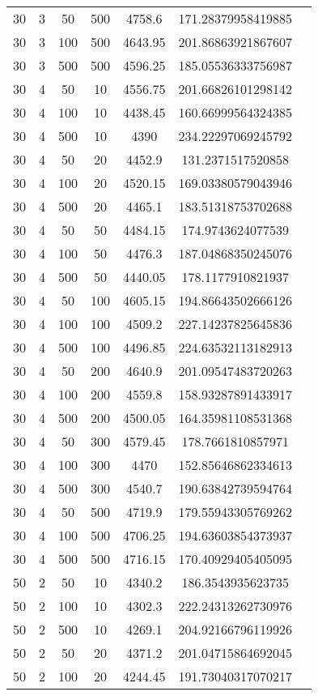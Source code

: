 {\begin{longtabu}{S
S
S
S
S
S[round-mode=places,round-precision=0]
S[round-mode=places,round-precision=0]}
30 & 3 & 50 & 500 & 4758.6 & 171.28379958419885 \\
30 & 3 & 100 & 500 & 4643.95 & 201.86863921867607 \\
30 & 3 & 500 & 500 & 4596.25 & 185.05536333756987 \\
30 & 4 & 50 & 10 & 4556.75 & 201.66826101298142 \\
30 & 4 & 100 & 10 & 4438.45 & 160.66999564324385 \\
30 & 4 & 500 & 10 & 4390 & 234.22297069245792 \\
30 & 4 & 50 & 20 & 4452.9 & 131.2371517520858 \\
30 & 4 & 100 & 20 & 4520.15 & 169.03380579043946 \\
30 & 4 & 500 & 20 & 4465.1 & 183.51318753702688 \\
30 & 4 & 50 & 50 & 4484.15 & 174.9743624077539 \\
30 & 4 & 100 & 50 & 4476.3 & 187.04868350245076 \\
30 & 4 & 500 & 50 & 4440.05 & 178.1177910821937 \\
30 & 4 & 50 & 100 & 4605.15 & 194.86643502666126 \\
30 & 4 & 100 & 100 & 4509.2 & 227.14237825645836 \\
30 & 4 & 500 & 100 & 4496.85 & 224.63532113182913 \\
30 & 4 & 50 & 200 & 4640.9 & 201.09547483720263 \\
30 & 4 & 100 & 200 & 4559.8 & 158.93287891433917 \\
30 & 4 & 500 & 200 & 4500.05 & 164.35981108531368 \\
30 & 4 & 50 & 300 & 4579.45 & 178.7661810857971 \\
30 & 4 & 100 & 300 & 4470 & 152.85646862334613 \\
30 & 4 & 500 & 300 & 4540.7 & 190.63842739594764 \\
30 & 4 & 50 & 500 & 4719.9 & 179.55943305769262 \\
30 & 4 & 100 & 500 & 4706.25 & 194.63603854373937 \\
30 & 4 & 500 & 500 & 4716.15 & 170.40929405405095 \\
50 & 2 & 50 & 10 & 4340.2 & 186.3543935623735 \\
50 & 2 & 100 & 10 & 4302.3 & 222.24313262730976 \\
50 & 2 & 500 & 10 & 4269.1 & 204.92166796119926 \\
50 & 2 & 50 & 20 & 4371.2 & 201.04715864692045 \\
50 & 2 & 100 & 20 & 4244.45 & 191.73040317070217 \\

\end{longtabu}}
